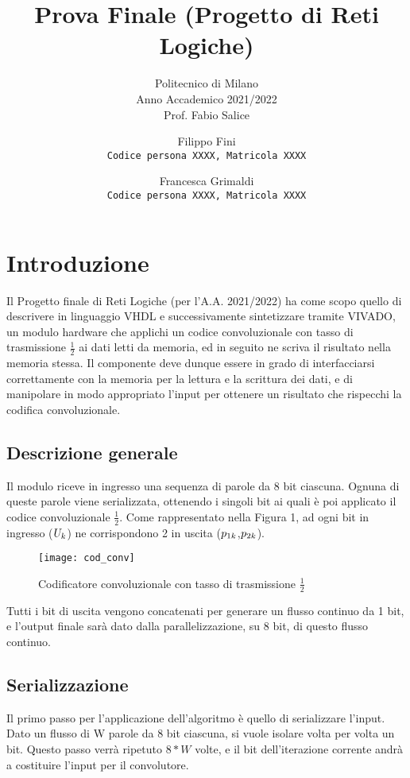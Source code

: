 \documentclass{article}
\title{%
    \vspace{4cm}
    \huge Prova Finale (Progetto di Reti Logiche)}
\subtitle{%
    Politecnico di Milano \\
    Anno Accademico 2021/2022 \\
    \vspace{0,3cm}
    Prof. Fabio Salice
    \vspace{7cm}
    }
\author{%
  Filippo Fini\\
  \texttt{Codice persona XXXX, Matricola XXXX}
  \and
  Francesca Grimaldi\\
  \texttt{Codice persona XXXX, Matricola XXXX}
}
\date{}
\begin{document}
\begin{titlingpage}
\maketitle
\end{titlingpage}


\tableofcontents


\newpage
\section{Introduzione}
Il Progetto finale di Reti Logiche (per l'A.A. 2021/2022) ha come scopo quello di descrivere in linguaggio VHDL e successivamente sintetizzare tramite VIVADO, un modulo hardware che applichi un codice convoluzionale con tasso di trasmissione $\frac{1}{2}$ ai dati letti da memoria, ed in seguito ne scriva il risultato nella memoria stessa.
Il componente deve dunque essere in grado di interfacciarsi correttamente con la memoria per la lettura e la scrittura dei dati, e di manipolare in modo appropriato l'input per ottenere un risultato che rispecchi la codifica convoluzionale.

\subsection{Descrizione generale}
Il modulo riceve in ingresso una sequenza di parole da 8 bit ciascuna. Ognuna di queste parole viene serializzata, ottenendo i singoli bit ai quali è poi applicato il codice convoluzionale $\frac{1}{2}$.
Come rappresentato nella Figura 1, ad ogni bit in ingresso ($U_{\small{k}}$) ne corrispondono 2 in uscita ($p_{\small{1k}}$,$p_{\small{2k}}$). 
\begin{figure}[H]
    \centering
    \texttt{[image: cod\_conv]}
    \caption{Codificatore convoluzionale con tasso di trasmissione $\frac{1}{2}$}
    \label{fig:cod_conv}
\end{figure}
Tutti i bit di uscita vengono concatenati per generare un flusso continuo da 1 bit, e l'output finale sarà dato dalla parallelizzazione, su 8 bit, di questo flusso continuo.

\subsection{Serializzazione}
Il primo passo per l'applicazione dell'algoritmo è quello di serializzare l'input. Dato un flusso di W parole da 8 bit ciascuna, si vuole isolare volta per volta un bit.
Questo passo verrà ripetuto $8*W$ volte, e il bit dell'iterazione corrente andrà a costituire l'input per il convolutore.
\end{document}
